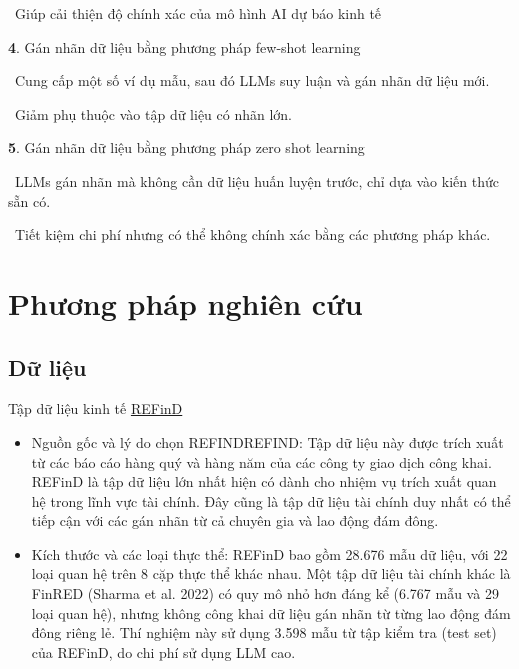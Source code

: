 \documentclass{article} %
\begin{document}
\hspace{10pt} \textbullet\ Giúp cải thiện độ chính xác của mô hình AI dự báo kinh tế

\textbf{4}. Gán nhãn dữ liệu bằng phương pháp few-shot learning

\hspace{10pt} \textbullet\ Cung cấp một số ví dụ mẫu, sau đó LLMs suy luận và gán nhãn dữ liệu mới.

\hspace{10pt} \textbullet\ Giảm phụ thuộc vào tập dữ liệu có nhãn lớn.

\textbf{5}. Gán nhãn dữ liệu bằng phương pháp zero shot learning

\hspace{10pt} \textbullet\ LLMs gán nhãn mà không cần dữ liệu huấn luyện trước, chỉ dựa vào kiến thức sẵn có.

\hspace{10pt} \textbullet\ Tiết kiệm chi phí nhưng có thể không chính xác bằng các phương pháp khác.

\section{Phương pháp nghiên cứu}

\subsection{Dữ liệu}
Tập dữ liệu kinh tế \hyperlink{ref:refind2023}{REFinD}

\begin{itemize}
    \item Nguồn gốc và lý do chọn REFINDREFIND: Tập dữ liệu này được trích xuất từ các báo cáo hàng quý và hàng năm của các công ty giao dịch công khai. 
REFinD là tập dữ liệu lớn nhất hiện có dành cho nhiệm vụ trích xuất quan hệ trong lĩnh vực tài chính. Đây cũng là tập dữ liệu tài chính duy 
nhất có thể tiếp cận với các gán nhãn từ cả chuyên gia và lao động đám đông.
    \item Kích thước và các loại thực thể: REFinD bao gồm 28.676 mẫu dữ liệu, với 22 loại quan hệ trên 8 cặp thực thể khác nhau. 
Một tập dữ liệu tài chính khác là FinRED (Sharma et al. 2022) có quy mô nhỏ hơn đáng kể (6.767 mẫu và 29 loại quan hệ), 
nhưng không công khai dữ liệu gán nhãn từ từng lao động đám đông riêng lẻ.
Thí nghiệm này sử dụng 3.598 mẫu từ tập kiểm tra (test set) của REFinD, do chi phí sử dụng LLM cao.

\end{itemize}
\end{document}
